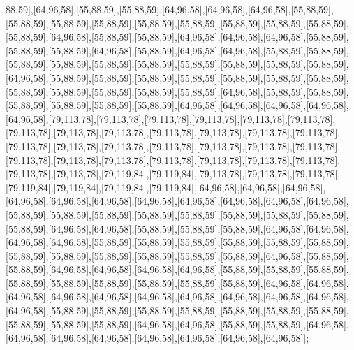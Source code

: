 88,59],[64,96,58],[55,88,59],[55,88,59],[64,96,58],[64,96,58],[64,96,58],[55,88,59],[55,88,59],[55,88,59],[55,88,59],[55,88,59],[55,88,59],[55,88,59],[55,88,59],[55,88,59],[55,88,59],[64,96,58],[55,88,59],[55,88,59],[64,96,58],[64,96,58],[64,96,58],[55,88,59],[55,88,59],[55,88,59],[64,96,58],[55,88,59],[64,96,58],[64,96,58],[55,88,59],[55,88,59],[55,88,59],[55,88,59],[55,88,59],[55,88,59],[55,88,59],[55,88,59],[55,88,59],[55,88,59],[64,96,58],[55,88,59],[55,88,59],[55,88,59],[55,88,59],[55,88,59],[55,88,59],[55,88,59],[55,88,59],[55,88,59],[55,88,59],[55,88,59],[55,88,59],[64,96,58],[55,88,59],[55,88,59],[55,88,59],[55,88,59],[55,88,59],[55,88,59],[64,96,58],[64,96,58],[64,96,58],[64,96,58],[64,96,58],[79,113,78],[79,113,78],[79,113,78],[79,113,78],[79,113,78],[79,113,78],[79,113,78],[79,113,78],[79,113,78],[79,113,78],[79,113,78],[79,113,78],[79,113,78],[79,113,78],[79,113,78],[79,113,78],[79,113,78],[79,113,78],[79,113,78],[79,113,78],[79,113,78],[79,113,78],[79,113,78],[79,113,78],[79,113,78],[79,113,78],[79,113,78],[79,113,78],[79,113,78],[79,119,84],[79,119,84],[79,113,78],[79,113,78],[79,113,78],[79,119,84],[79,119,84],[79,119,84],[79,119,84],[64,96,58],[64,96,58],[64,96,58],[64,96,58],[64,96,58],[64,96,58],[64,96,58],[64,96,58],[64,96,58],[64,96,58],[64,96,58],[55,88,59],[55,88,59],[55,88,59],[55,88,59],[55,88,59],[55,88,59],[55,88,59],[55,88,59],[55,88,59],[64,96,58],[64,96,58],[55,88,59],[55,88,59],[55,88,59],[64,96,58],[64,96,58],[64,96,58],[64,96,58],[55,88,59],[55,88,59],[55,88,59],[55,88,59],[55,88,59],[55,88,59],[55,88,59],[55,88,59],[55,88,59],[55,88,59],[55,88,59],[55,88,59],[64,96,58],[55,88,59],[55,88,59],[64,96,58],[64,96,58],[64,96,58],[64,96,58],[55,88,59],[55,88,59],[55,88,59],[55,88,59],[55,88,59],[55,88,59],[55,88,59],[55,88,59],[55,88,59],[64,96,58],[64,96,58],[64,96,58],[64,96,58],[64,96,58],[64,96,58],[64,96,58],[64,96,58],[64,96,58],[64,96,58],[64,96,58],[55,88,59],[55,88,59],[55,88,59],[55,88,59],[55,88,59],[55,88,59],[55,88,59],[55,88,59],[55,88,59],[55,88,59],[64,96,58],[64,96,58],[55,88,59],[55,88,59],[64,96,58],[64,96,58],[64,96,58],[64,96,58],[64,96,58],[64,96,58],[64,96,58],[64,96,58]];

